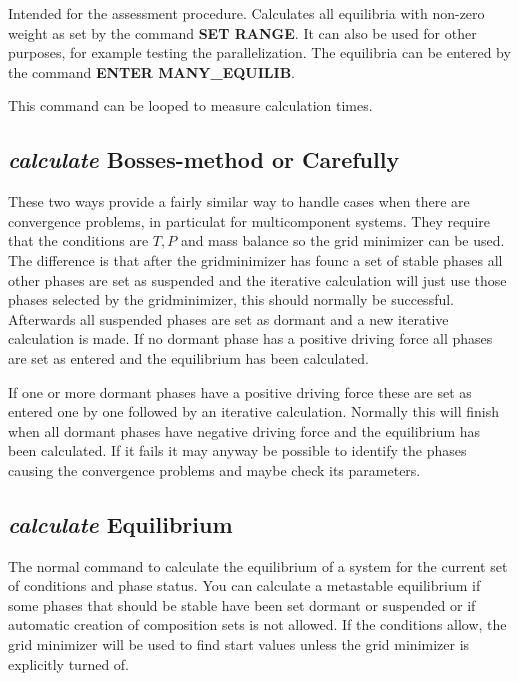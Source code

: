 \documentclass[11pt]{article}
\begin{document}
Intended for the assessment procedure.  Calculates all equilibria with
non-zero weight as set by the command {\bf SET RANGE}.  It can also be
used for other purposes, for example testing the parallelization.  The
equilibria can be entered by the command {\bf ENTER MANY\_EQUILIB}.

This command can be looped to measure calculation times.

\hypertarget{Calculate Bosses-method}{}
\hypertarget{Calculate carefully}{}
\subsection{{\em calculate} Bosses-method or Carefully}\label{sc:calcbosse}\label{sc:calccare}

  These two ways provide a fairly similar way to handle cases when
  there are convergence problems, in particulat for multicomponent
  systems.  They require that the conditions are $T, P$ and mass
  balance so the grid minimizer can be used.  The difference is that
  after the gridminimizer has founc a set of stable phases all other
  phases are set as suspended and the iterative calculation will just
  use those phases selected by the gridminimizer, this should normally
  be successful.  Afterwards all suspended phases are set as dormant
  and a new iterative calculation is made.  If no dormant phase has a
  positive driving force all phases are set as entered and the
  equilibrium has been calculated.

  If one or more dormant phases have a positive driving force these
  are set as entered one by one followed by an iterative calculation.
  Normally this will finish when all dormant phases have negative
  driving force and the equilibrium has been calculated.  If it fails
  it may anyway be possible to identify the phases causing the
  convergence problems and maybe check its parameters.
  
\hypertarget{Calculate equilibrium}{}
\subsection{{\em calculate} Equilibrium}\label{sc:calceq}

The normal command to calculate the equilibrium of a system for the
current set of conditions and phase status.  You can calculate a
metastable equilibrium if some phases that should be stable have been
set dormant or suspended or if automatic creation of composition sets
is not allowed.  If the conditions allow, the grid minimizer will be
used to find start values unless the grid minimizer is explicitly
turned of.
\end{document}
